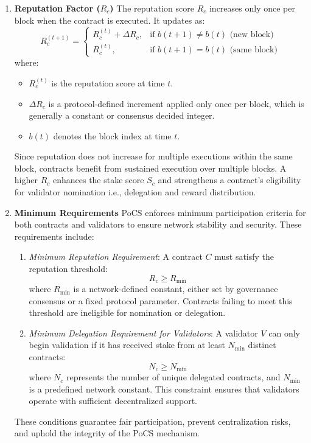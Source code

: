 \documentclass{article}
\begin{document}
\begin{enumerate}
    \item \textbf{Reputation Factor ($R_c$)} The reputation score $R_c$ increases only once per block when the contract is executed. It updates as:  
    \begin{equation}
        R_c^{(t+1)} =
        \begin{cases} 
        R_c^{(t)} + \Delta R_c, & \text{if } b(t+1) \neq b(t) \text{ (new block)} \\
        R_c^{(t)}, & \text{if } b(t+1) = b(t) \text{ (same block)}
        \end{cases}
    \end{equation}
    where:
    \begin{itemize}
        \item $R_c^{(t)}$ is the reputation score at time $t$.
        \item $\Delta R_c$ is a protocol-defined increment applied only once per block, which is generally a constant or consensus decided integer.
        \item $b(t)$ denotes the block index at time $t$.
    \end{itemize}
    Since reputation does not increase for multiple executions within the same block, contracts benefit from sustained execution over multiple blocks. A higher $R_c$ enhances the stake score $S_c$ and strengthens a contract’s eligibility for validator nomination i.e., delegation and reward distribution.

    \item \textbf{Minimum Requirements} PoCS enforces minimum participation criteria for both contracts and validators to ensure network stability and security. These requirements include:  
    \begin{enumerate}
        \item \textit{Minimum Reputation Requirement}: A contract $C$ must satisfy the reputation threshold:  
            \begin{equation}
                R_c \geq R_{\text{min}}
            \end{equation}
            where $R_{\text{min}}$ is a network-defined constant, either set by governance consensus or a fixed protocol parameter. Contracts failing to meet this threshold are ineligible for nomination or delegation.
            
        \item \textit{Minimum Delegation Requirement for Validators}: A validator $V$ can only begin validation if it has received stake from at least $N_{\text{min}}$ distinct contracts:  
            \begin{equation}
                N_c \geq N_{\text{min}}
            \end{equation}
            where $N_c$ represents the number of unique delegated contracts, and $N_{\text{min}}$ is a predefined network constant. This constraint ensures that validators operate with sufficient decentralized support.
    \end{enumerate}
    These conditions guarantee fair participation, prevent centralization risks, and uphold the integrity of the PoCS mechanism.

\end{enumerate}
\end{document}
